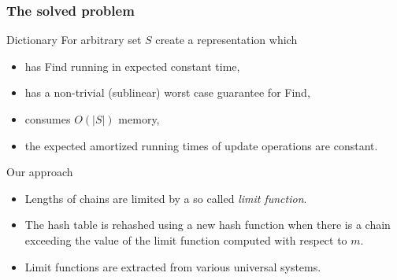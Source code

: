 \begin{frame}
	\frametitle{The solved problem}

	\begin{block}{Dictionary}
		For arbitrary set $S$ create a representation which
		\begin{itemize}
			\item has Find running in expected constant time,
			\item has a non-trivial (sublinear) worst case guarantee for Find,
			\item consumes $O(|S|)$ memory,
			\item the expected amortized running times of update operations are constant.
		\end{itemize}
	\end{block}

	\begin{block}{Our approach}
		\begin{itemize}
			\item Lengths of chains are limited by a so called \emph{limit function}.			
			\item The hash table is rehashed using a new hash function when there is a chain exceeding the value of the limit function computed with respect to $m$.
			\item Limit functions are extracted from various universal systems.
		\end{itemize}
	\end{block}
\end{frame}

